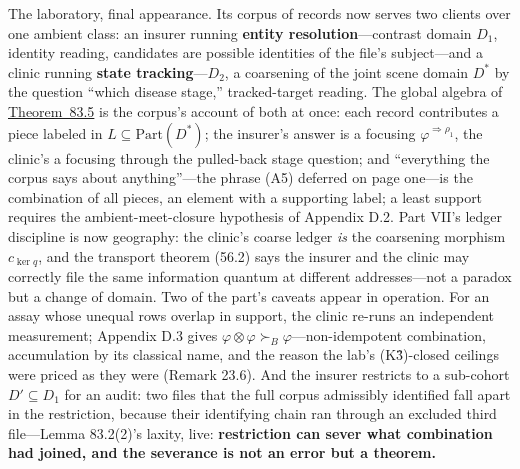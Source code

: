 
The laboratory, final appearance. Its corpus of records now serves two clients over one ambient class: an insurer running \textbf{entity resolution}---\hspace{0pt}contrast domain \(D_1\), identity reading, candidates are possible identities of the file's subject---\hspace{0pt}and a clinic running \textbf{state tracking}---\hspace{0pt}\(D_2\), a coarsening of the joint scene domain \(D^*\) by the question ``which disease stage,'' tracked-target reading. The global algebra of \hyperlink{stmt:83.5}{Theorem~83.5} is the corpus's account of both at once: each record contributes a piece labeled in \(L \subseteq \mathrm{Part}(D^*)\); the insurer's answer is a focusing \(\varphi^{\Rightarrow \rho_1}\), the clinic's a focusing through the pulled-back stage question; and ``everything the corpus says about anything''---\hspace{0pt}the phrase (A5) deferred on page one---\hspace{0pt}is the combination of all pieces, an element with a supporting label; a least support requires the ambient-meet-closure hypothesis of Appendix D.2. Part VII's ledger discipline is now geography: the clinic's coarse ledger \emph{is} the coarsening morphism \(c_{\ker q}\), and the transport theorem (56.2) says the insurer and the clinic may correctly file the same information quantum at different addresses---\hspace{0pt}not a paradox but a change of domain. Two of the part's caveats appear in operation. For an assay whose unequal rows overlap in support, the clinic re-runs an independent measurement; Appendix D.3 gives \(\varphi\otimes\varphi\succ_B\varphi\)---\hspace{0pt}non-idempotent combination, accumulation by its classical name, and the reason the lab's (K3̂)-closed ceilings were priced as they were (Remark 23.6). And the insurer restricts to a sub-cohort \(D' \subseteq D_1\) for an audit: two files that the full corpus admissibly identified fall apart in the restriction, because their identifying chain ran through an excluded third file---\hspace{0pt}Lemma 83.2(2)'s laxity, live: \textbf{restriction can sever what combination had joined, and the severance is not an error but a theorem.}


